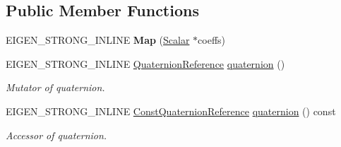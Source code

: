 \subsection*{Public Member Functions}
\begin{DoxyCompactItemize}
\item 
E\+I\+G\+E\+N\+\_\+\+S\+T\+R\+O\+N\+G\+\_\+\+I\+N\+L\+I\+NE {\bfseries Map} (\hyperlink{class_eigen_1_1_map_3_01_sophus_1_1_rx_s_o3_group_3_01___scalar_01_4_00_01___options_01_4_a7810f1290abcedb01ffc558ddef2484f}{Scalar} $\ast$coeffs)\hypertarget{class_eigen_1_1_map_3_01_sophus_1_1_rx_s_o3_group_3_01___scalar_01_4_00_01___options_01_4_a927226af907a202897f12382a5cde67e}{}\label{class_eigen_1_1_map_3_01_sophus_1_1_rx_s_o3_group_3_01___scalar_01_4_00_01___options_01_4_a927226af907a202897f12382a5cde67e}

\item 
E\+I\+G\+E\+N\+\_\+\+S\+T\+R\+O\+N\+G\+\_\+\+I\+N\+L\+I\+NE \hyperlink{class_eigen_1_1_map_3_01_sophus_1_1_rx_s_o3_group_3_01___scalar_01_4_00_01___options_01_4_a01177f5e76c76c682e092fa794a5ae15}{Quaternion\+Reference} \hyperlink{class_eigen_1_1_map_3_01_sophus_1_1_rx_s_o3_group_3_01___scalar_01_4_00_01___options_01_4_ae78ec49b1edafe71ccf199f24a9e251b}{quaternion} ()\hypertarget{class_eigen_1_1_map_3_01_sophus_1_1_rx_s_o3_group_3_01___scalar_01_4_00_01___options_01_4_ae78ec49b1edafe71ccf199f24a9e251b}{}\label{class_eigen_1_1_map_3_01_sophus_1_1_rx_s_o3_group_3_01___scalar_01_4_00_01___options_01_4_ae78ec49b1edafe71ccf199f24a9e251b}

\begin{DoxyCompactList}\small\item\em Mutator of quaternion. \end{DoxyCompactList}\item 
E\+I\+G\+E\+N\+\_\+\+S\+T\+R\+O\+N\+G\+\_\+\+I\+N\+L\+I\+NE \hyperlink{class_eigen_1_1_map_3_01_sophus_1_1_rx_s_o3_group_3_01___scalar_01_4_00_01___options_01_4_a02c1dbb3516a5492fab49f7aeb74b264}{Const\+Quaternion\+Reference} \hyperlink{class_eigen_1_1_map_3_01_sophus_1_1_rx_s_o3_group_3_01___scalar_01_4_00_01___options_01_4_a4c5dcaf4155bcdc964ea8bd8b461d8f2}{quaternion} () const \hypertarget{class_eigen_1_1_map_3_01_sophus_1_1_rx_s_o3_group_3_01___scalar_01_4_00_01___options_01_4_a4c5dcaf4155bcdc964ea8bd8b461d8f2}{}\label{class_eigen_1_1_map_3_01_sophus_1_1_rx_s_o3_group_3_01___scalar_01_4_00_01___options_01_4_a4c5dcaf4155bcdc964ea8bd8b461d8f2}

\begin{DoxyCompactList}\small\item\em Accessor of quaternion. \end{DoxyCompactList}\end{DoxyCompactItemize}

